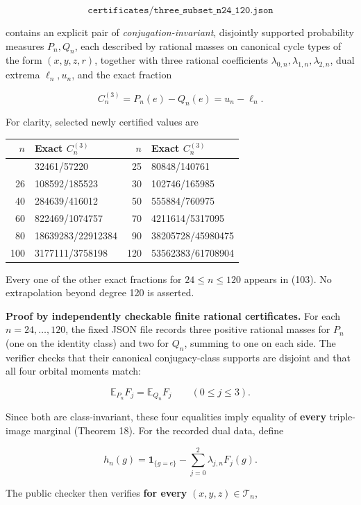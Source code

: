 \documentclass[
  11pt,
]{article}
\begin{document}
\[
\texttt{certificates/three\_subset\_n24\_120.json} \tag{103}
\]

contains an explicit pair of \emph{conjugation-invariant}, disjointly
supported probability measures \(P_n,Q_n\), each described by rational
masses on canonical cycle types of the form \((x,y,z,r)\), together with
three rational coefficients
\(\lambda_{0,n},\lambda_{1,n},\lambda_{2,n}\), dual extrema
\(\ell_n,u_n\), and the exact fraction

\[
C_n^{(3)}=P_n(e)-Q_n(e)=u_n-\ell_n. \tag{104}
\]

For clarity, selected newly certified values are

\begin{longtable}[]{@{}rlrl@{}}
\toprule\noalign{}
\(n\) & Exact \(C_n^{(3)}\) & \(n\) & Exact \(C_n^{(3)}\) \\
\midrule\noalign{}
\endhead
\bottomrule\noalign{}
\endlastfoot
24 & 32461/57220 & 25 & 80848/140761 \\
26 & 108592/185523 & 30 & 102746/165985 \\
40 & 284639/416012 & 50 & 555884/760975 \\
60 & 822469/1074757 & 70 & 4211614/5317095 \\
80 & 18639283/22912384 & 90 & 38205728/45980475 \\
100 & 3177111/3758198 & 120 & 53562383/61708904 \\
\end{longtable}

Every one of the other exact fractions for \(24\le n\le120\) appears in
(103). No extrapolation beyond degree 120 is asserted.

\textbf{Proof by independently checkable finite rational certificates.}
For each \(n=24,\ldots,120\), the fixed JSON file records three positive
rational masses for \(P_n\) (one on the identity class) and two for
\(Q_n\), summing to one on each side. The verifier checks that their
canonical conjugacy-class supports are disjoint and that all four
orbital moments match:

\[
\mathbb E_{P_n}F_j=\mathbb E_{Q_n}F_j\qquad(0\le j\le3). \tag{105}
\]

Since both are class-invariant, these four equalities imply equality of
\textbf{every} triple-image marginal (Theorem 18). For the recorded dual
data, define

\[
h_n(g)=\mathbf1_{\{g=e\}}-
\sum_{j=0}^2\lambda_{j,n}F_j(g). \tag{106}
\]

The public checker then verifies \textbf{for every}
\((x,y,z)\in\mathcal T_n\),
\end{document}

